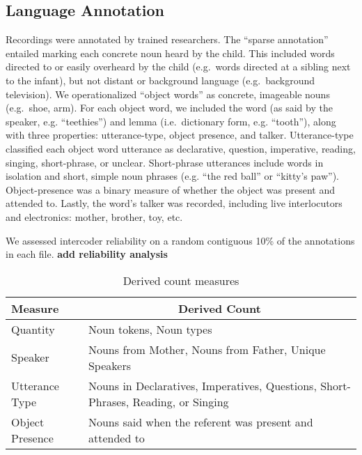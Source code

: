 \documentclass[floatsintext,man]{apa6}
\theoremstyle{definition}
\theoremstyle{definition}
\theoremstyle{definition}
\theoremstyle{remark}
\begin{document}
\subsection{Language Annotation}\label{language-annotation}

Recordings were annotated by trained researchers. The \enquote{sparse
annotation} entailed marking each concrete noun heard by the child. This
included words directed to or easily overheard by the child (e.g.~words
directed at a sibling next to the infant), but not distant or background
language (e.g.~background television). We operationalized
\enquote{object words} as concrete, imageable nouns (e.g.~shoe, arm).
For each object word, we included the word (as said by the speaker, e.g.
\enquote{teethies}) and lemma (i.e.~dictionary form, e.g.
\enquote{tooth}), along with three properties: utterance-type, object
presence, and talker. Utterance-type classified each object word
utterance as declarative, question, imperative, reading, singing,
short-phrase, or unclear. Short-phrase utterances include words in
isolation and short, simple noun phrases (e.g. \enquote{the red ball} or
\enquote{kitty's paw}). Object-presence was a binary measure of whether
the object was present and attended to. Lastly, the word's talker was
recorded, including live interlocutors and electronics: mother, brother,
toy, etc.

We assessed intercoder reliability on a random contiguous 10\% of the
annotations in each file. \textbf{add reliability analysis}

\begin{table}[tbp]
\begin{center}
\begin{threeparttable}
\caption{\label{tab:measures-tab}Derived count measures}
\small{
\begin{tabular}{ll}
\toprule
Measure & \multicolumn{1}{c}{Derived Count}\\
\midrule
Quantity & Noun tokens, Noun types\\
Speaker & Nouns from Mother, Nouns from Father, Unique Speakers\\
Utterance Type & Nouns in Declaratives, Imperatives, Questions, Short-Phrases, Reading, or Singing\\
Object Presence & Nouns said when the referent was present and attended to\\
\bottomrule
\end{tabular}
}
\end{threeparttable}
\end{center}
\end{table}
\end{document}
